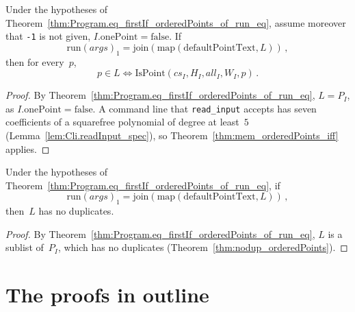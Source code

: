 \begin{theorem}\label{thm:Program.mem_iff_isPoint_of_run_eq}
  \leanok
  Under the hypotheses of Theorem~\ref{thm:Program.eq_firstIf_orderedPoints_of_run_eq}, assume
  moreover that \texttt{-1} is not given, $I.\mathrm{onePoint} = \mathrm{false}$. If
  \[ \mathrm{run}(\mathit{args})_1 = \mathrm{join}(\mathrm{map}(\mathrm{defaultPointText}, L))\,, \]
  then for every~$p$,
  \[ p \in L \iff \mathrm{IsPoint}(\mathit{cs}_I, H_I, \mathit{all}_I, W_I, p)\,. \]
\end{theorem}

\begin{proof}
  \leanok
  By Theorem~\ref{thm:Program.eq_firstIf_orderedPoints_of_run_eq}, $L = P_I$, as
  $I.\mathrm{onePoint} = \mathrm{false}$. A command line that
  \texttt{read\_input} accepts has seven coefficients of a squarefree polynomial of degree at
  least~$5$ (Lemma~\ref{lem:Cli.readInput_spec}), so Theorem~\ref{thm:mem_orderedPoints_iff}
  applies.
\end{proof}

\begin{theorem}\label{thm:Program.nodup_of_run_eq}
  \leanok
  Under the hypotheses of Theorem~\ref{thm:Program.eq_firstIf_orderedPoints_of_run_eq}, if
  \[ \mathrm{run}(\mathit{args})_1 = \mathrm{join}(\mathrm{map}(\mathrm{defaultPointText}, L))\,, \]
  then~$L$ has no duplicates.
\end{theorem}

\begin{proof}
  \leanok
  By Theorem~\ref{thm:Program.eq_firstIf_orderedPoints_of_run_eq}, $L$ is a sublist of~$P_I$, which
  has no duplicates (Theorem~\ref{thm:nodup_orderedPoints}).
\end{proof}

\section{The proofs in outline}\label{sec:theoremsProofs}

